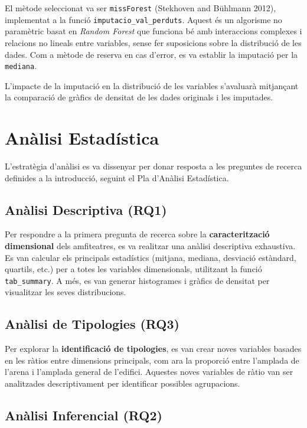 \documentclass[
  12pt,
  letterpaper,
  DIV=11,
  numbers=noendperiod]{scrreprt}
\begin{document}
El mètode seleccionat va ser \texttt{missForest} (Stekhoven and Bühlmann
2012), implementat a la funció \texttt{imputacio\_val\_perduts}. Aquest
és un algorisme no paramètric basat en \emph{Random Forest} que funciona
bé amb interaccions complexes i relacions no lineals entre variables,
sense fer suposicions sobre la distribució de les dades. Com a mètode de
reserva en cas d'error, es va establir la imputació per la
\texttt{mediana}.

L'impacte de la imputació en la distribució de les variables s'avaluarà
mitjançant la comparació de gràfics de densitat de les dades originals i
les imputades.

\section{Anàlisi Estadística}\label{anuxe0lisi-estaduxedstica}

L'estratègia d'anàlisi es va dissenyar per donar resposta a les
preguntes de recerca definides a la introducció, seguint el Pla
d'Anàlisi Estadística.

\subsection{Anàlisi Descriptiva (RQ1)}\label{anuxe0lisi-descriptiva-rq1}

Per respondre a la primera pregunta de recerca sobre la
\textbf{caracterització dimensional} dels amfiteatres, es va realitzar
una anàlisi descriptiva exhaustiva. Es van calcular els principals
estadístics (mitjana, mediana, desviació estàndard, quartils, etc.) per
a totes les variables dimensionals, utilitzant la funció
\texttt{tab\_summary}. A més, es van generar histogrames i gràfics de
densitat per visualitzar les seves distribucions.

\subsection{Anàlisi de Tipologies
(RQ3)}\label{anuxe0lisi-de-tipologies-rq3}

Per explorar la \textbf{identificació de tipologies}, es van crear noves
variables basades en les ràtios entre dimensions principals, com ara la
proporció entre l'amplada de l'arena i l'amplada general de l'edifici.
Aquestes noves variables de ràtio van ser analitzades descriptivament
per identificar possibles agrupacions.

\subsection{Anàlisi Inferencial (RQ2)}\label{anuxe0lisi-inferencial-rq2}
\end{document}
